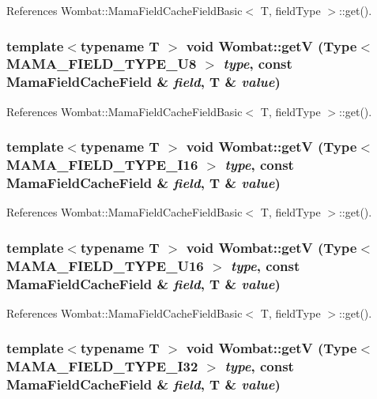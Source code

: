 References Wombat::MamaFieldCacheFieldBasic$<$ T, fieldType $>$::get().\hypertarget{namespaceWombat_a8e5c491e5005615cf95b04824d0c9204}{
\subsubsection[{getV}]{\setlength{\rightskip}{0pt plus 5cm}template$<$typename T $>$ void Wombat::getV (Type$<$ MAMA\_\-FIELD\_\-TYPE\_\-U8 $>$ {\em type}, \/  const MamaFieldCacheField \& {\em field}, \/  T \& {\em value})}}
\label{namespaceWombat_a8e5c491e5005615cf95b04824d0c9204}


References Wombat::MamaFieldCacheFieldBasic$<$ T, fieldType $>$::get().\hypertarget{namespaceWombat_a974369cb77029edd2761777dbcad4ed8}{
\subsubsection[{getV}]{\setlength{\rightskip}{0pt plus 5cm}template$<$typename T $>$ void Wombat::getV (Type$<$ MAMA\_\-FIELD\_\-TYPE\_\-I16 $>$ {\em type}, \/  const MamaFieldCacheField \& {\em field}, \/  T \& {\em value})}}
\label{namespaceWombat_a974369cb77029edd2761777dbcad4ed8}


References Wombat::MamaFieldCacheFieldBasic$<$ T, fieldType $>$::get().\hypertarget{namespaceWombat_a67c61b27dc82f7c20475967490ea067f}{
\subsubsection[{getV}]{\setlength{\rightskip}{0pt plus 5cm}template$<$typename T $>$ void Wombat::getV (Type$<$ MAMA\_\-FIELD\_\-TYPE\_\-U16 $>$ {\em type}, \/  const MamaFieldCacheField \& {\em field}, \/  T \& {\em value})}}
\label{namespaceWombat_a67c61b27dc82f7c20475967490ea067f}


References Wombat::MamaFieldCacheFieldBasic$<$ T, fieldType $>$::get().\hypertarget{namespaceWombat_a9cde178e4fe347903e3a276779d8d48d}{
\subsubsection[{getV}]{\setlength{\rightskip}{0pt plus 5cm}template$<$typename T $>$ void Wombat::getV (Type$<$ MAMA\_\-FIELD\_\-TYPE\_\-I32 $>$ {\em type}, \/  const MamaFieldCacheField \& {\em field}, \/  T \& {\em value})}}
\label{namespaceWombat_a9cde178e4fe347903e3a276779d8d48d}


